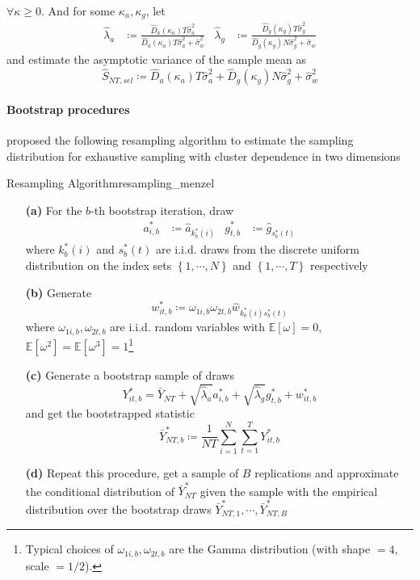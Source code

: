 \documentclass[twoside]{article}
\begin{document}
$\forall \kappa \geq 0$. And for some $\kappa_a,\kappa_g$, let 
\begin{align*}
    \hat{\lambda}_a & \coloneq \frac{\hat{D}_a (\kappa_a)T\hat{\sigma}^2_a}{\hat{D}_a (\kappa_a)T\hat{\sigma}^2_a+\hat{\sigma}_w^2} & \hat{\lambda}_g & \coloneq \frac{\hat{D}_g (\kappa_g)T\hat{\sigma}^2_g}{\hat{D}_g (\kappa_g)N\hat{\sigma}^2_g + \hat{\sigma}_w}
\end{align*}
and estimate the asymptotic variance of the sample mean as 
\begin{equation}\label{eq:asymp_variance}
    \hat{S}_{NT,sel}\coloneq \hat{D}_a(\kappa_a)T\hat{\sigma}^2_a + \hat{D}_g (\kappa_g) N\hat{\sigma}^2_g + \hat{\sigma}^2_w
\end{equation}

\paragraph*{Bootstrap procedures}
\citet{menzel2021bootstrap} proposed the following resampling algorithm to estimate the sampling distribution for exhaustive sampling with cluster dependence in two dimensions 
\begin{algorithm}{Resampling Algorithm}{resampling_menzel}
    \begin{itemize}
        \item[\textbf{(a)}] For the $b$-th bootstrap iteration, draw 
        \begin{align*}
            a^*_{i,b} &\coloneq \hat{a}_{k^*_b(i)} & g^*_{t,b} &\coloneq \hat{g}_{s^*_b(t)}
        \end{align*}
        where $k^*_b(i)$ and $s^*_b(t)$ are i.i.d. draws from the discrete uniform distribution on the index sets $\left\{1,\cdots,N\right\}$ and $\left\{1,\cdots,T\right\}$ respectively
        \item[\textbf{(b)}] Generate $$ w^*_{it,b} \coloneq \omega_{1i,b}\omega_{2t,b}\hat{w}_{k^*_b(i)s^*_b(t)} $$ where $\omega_{1i,b},\omega_{2t,b}$ are i.i.d. random variables with $\mathbb{E}\left[\omega\right]=0$, $\mathbb{E}\left[\omega^2\right] = \mathbb{E}\left[\omega^3\right] = 1$\footnote{Typical choices of $\omega_{1i,b},\omega_{2t,b}$ are the Gamma distribution (with shape $=4$, scale $=1/2$).}
        \item[\textbf{(c)}] Generate a bootstrap sample of draws $$ Y^*_{it,b} = \bar{Y}_{NT} + \sqrt{\hat{\lambda}_a}a^*_{i,b} + \sqrt{\hat{\lambda}_g}g^*_{t,b} + w^*_{it,b} $$ and get the bootstrapped statistic $$ \bar{Y}^*_{NT,b} \coloneq \frac{1}{NT} \sum^N_{i=1}\sum^T_{t=1}Y^*_{it,b} $$ 
        \item[\textbf{(d)}] Repeat this procedure, get a sample of $B$ replications and approximate the conditional distribution of $\bar{Y}^*_{NT}$ given the sample with the empirical distribution over the bootstrap draws $\bar{Y}^*_{NT,1},\cdots,\bar{Y}^*_{NT,B}$ 
    \end{itemize}
\end{algorithm}
\end{document}
